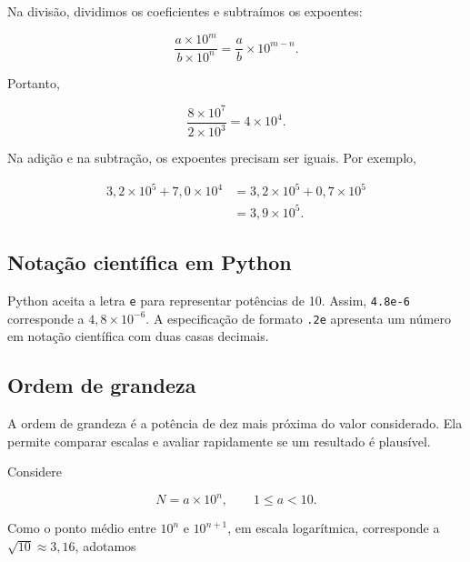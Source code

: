 Na divisão, dividimos os coeficientes e subtraímos os expoentes:

\begin{equation}
  \frac{a\times10^m}{b\times10^n}
  =\frac{a}{b}\times10^{m-n}.
\end{equation}

Portanto,

\begin{equation}
  \frac{8\times10^7}{2\times10^3}
  =4\times10^4.
\end{equation}

Na adição e na subtração, os expoentes precisam ser iguais. Por exemplo,

\begin{align}
  3{,}2\times10^5+7{,}0\times10^4
  &=3{,}2\times10^5+0{,}7\times10^5\\
  &=3{,}9\times10^5.
\end{align}

\subsection{Notação científica em Python}

Python aceita a letra \texttt{e} para representar potências de 10. Assim, \texttt{4.8e-6} corresponde a $4{,}8\times10^{-6}$. A especificação de formato \texttt{.2e} apresenta um número em notação científica com duas casas decimais.





\subsection{Ordem de grandeza}

A ordem de grandeza é a potência de dez mais próxima do valor considerado. Ela permite comparar escalas e avaliar rapidamente se um resultado é plausível.

Considere

\begin{equation}
  N=a\times10^n,
  \qquad 1\leq a<10.
\end{equation}

Como o ponto médio entre $10^n$ e $10^{n+1}$, em escala logarítmica, corresponde a $\sqrt{10}\approx3{,}16$, adotamos

